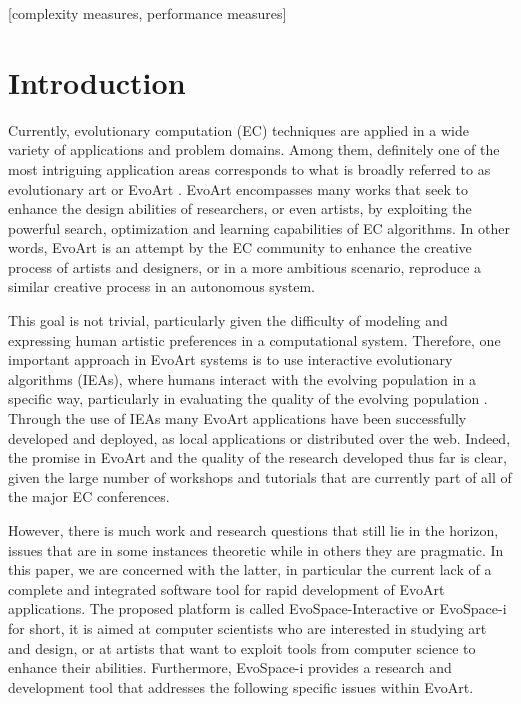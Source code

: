 \documentclass{sig-alternate}
\begin{document}
[complexity measures, performance measures]



\section{Introduction}
Currently, evolutionary computation (EC) techniques are applied in a wide variety of applications and problem domains.
Among them, definitely one of the most intriguing application areas corresponds to what is broadly referred to as evolutionary art or EvoArt  \cite{Bentley:1999:intro,ie1}.
EvoArt encompasses many works that seek to enhance the design abilities of researchers, or even artists, by exploiting the powerful search, optimization
and learning capabilities of EC algorithms.
In other words, EvoArt is an attempt by the EC community to enhance the creative process of artists and designers,
or in a more ambitious scenario, reproduce a similar creative process in an autonomous system.

This goal is not trivial, particularly given the difficulty of modeling and expressing human artistic preferences in a computational system.
Therefore, one important approach in EvoArt systems is to use interactive evolutionary algorithms (IEAs),
where humans interact with the evolving population in a specific way, particularly in evaluating the quality of the evolving population \cite{ie1,ie2}.
Through the use of IEAs many EvoArt applications have been successfully developed and deployed, as local applications or distributed over the web.
Indeed, the promise in EvoArt and the quality of the research developed thus far is clear, given the large number of workshops and tutorials that
are currently part of all of the major EC conferences.

However, there is much work and research questions that still lie in the horizon, issues that are in some instances theoretic while in others they are pragmatic.
In this paper, we are concerned with the latter, in particular the current lack of a complete and integrated software tool for rapid development
of EvoArt applications.
The proposed platform is called EvoSpace-Interactive or EvoSpace-i for short, it is aimed at computer scientists who are interested in studying art and design, or at artists that want
to exploit tools from computer science to enhance their abilities.
Furthermore, EvoSpace-i provides a research and development tool that addresses the following specific issues within EvoArt.
\end{document}
